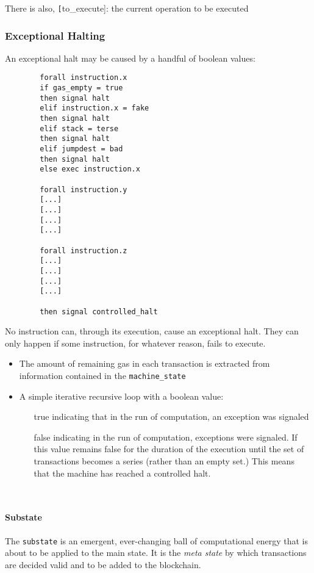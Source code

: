 \documentclass[10pt,a4paper,leqno,bibliography=totoc]{scrartcl}
\newenvironment{alphafootnotes}
{\par\edef\savedfootnotenumber{\number\value{footnote}}
\renewcommand{\thefootnote}{\alph{footnote}}
\setcounter{footnote}{0}}
{\par\setcounter{footnote}{\savedfootnotenumber}}
\begin{document}
\begin{alphafootnotes}
\begin{multicols*}{2}
		There is also, \texttt[to\_execute]: the current operation to be executed
		
		\subsubsection{Exceptional Halting}
		An exceptional halt may be caused by a handful of boolean values:
		
		\begin{verbatim}
		forall instruction.x
		if gas_empty = true
		then signal halt
		elif instruction.x = fake
		then signal halt
		elif stack = terse
		then signal halt
		elif jumpdest = bad
		then signal halt
		else exec instruction.x
		
		forall instruction.y 
		[...]
		[...]
		[...]
		[...]
		
		forall instruction.z 
		[...]
		[...]
		[...]
		[...]
		
		then signal controlled_halt
		\end{verbatim}
		
		No instruction can, through its execution, cause an exceptional halt. They can only happen if some instruction, for whatever reason, fails to execute.
		
		\begin{itemize}
			\item The amount of remaining gas in each transaction is extracted from information contained in the \texttt{machine\_state} 
			\item A simple iterative recursive  loop\supercite{Wood2017} with a boolean  value: 
			\begin{itemize}
				\item[true] indicating that in the run of computation, an exception was signaled
				\item[false] indicating in the run of computation, exceptions were signaled. If this value remains false for the duration of the execution until the set of transactions becomes a series (rather than an empty set.) This means that the machine has reached a controlled halt. 
			\end{itemize}
		\end{itemize}
    		\
				\paragraph{Substate}
					The \texttt{substate} is an emergent, ever-changing ball of computational energy that is about to be applied to the main state. It is the \textit{meta state} by which transactions are decided valid and to be added to the blockchain.
		

\end{multicols*}
\end{alphafootnotes}
\end{document}
